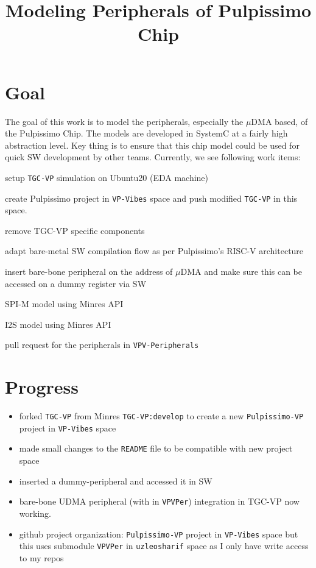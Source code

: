 \documentclass{article}
\title{Modeling Peripherals of Pulpissimo Chip}
\newcommand{\cmark}{\ding{51}}%
\newcommand{\done}{\rlap{$\square$}{\raisebox{2pt}{\large\hspace{1pt}\cmark}}%
\hspace{-2.5pt}}
\begin{document}
\maketitle


\section{Goal}
The goal of this work is to model the peripherals, especially the $\mu$DMA based, of the Pulpissimo Chip.
The models are developed in SystemC at a fairly high abstraction level. Key thing is to ensure that this
chip model could be used for quick SW development by other teams. Currently, we see following work items:

\begin{todolist}
 \item[\done] setup \texttt{TGC-VP} simulation on Ubuntu20 (EDA machine)
 \item[\done] create Pulpissimo project in \texttt{VP-Vibes} space and push modified \texttt{TGC-VP} in this space.
 \item remove TGC-VP specific components
 \item[\done] adapt bare-metal SW compilation flow as per Pulpissimo's RISC-V architecture
 \item[\done] insert bare-bone peripheral on the address of $\mu$DMA and make sure this can be accessed on a
 dummy register via SW
 \item SPI-M model using Minres API
 \item I2S model using Minres API
 \item[\done] pull request for the peripherals in \texttt{VPV-Peripherals}
\end{todolist}

\section{Progress}
\begin{itemize}
 \item forked \texttt{TGC-VP} from Minres \texttt{TGC-VP:develop} to create a new \texttt{Pulpissimo-VP} project in
       \texttt{VP-Vibes} space
 \item made small changes to the \texttt{README} file to be compatible with new project space
 \item inserted a dummy-peripheral and accessed it in SW
 \item bare-bone UDMA peripheral (with in \texttt{VPVPer}) integration in TGC-VP now working.
 \item github project organization: \texttt{Pulpissimo-VP} project in \texttt{VP-Vibes} space but this uses
       submodule \texttt{VPVPer} in \texttt{uzleosharif} space as I only have write access to my repos
\end{itemize}
\end{document}
